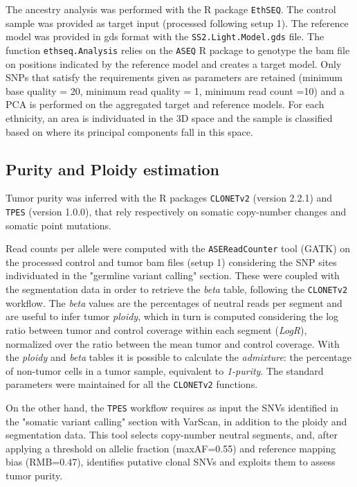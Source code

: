 \documentclass[11pt]{article}
\begin{document}
The ancestry analysis was performed with the R package \texttt{EthSEQ}\cite{ethseq}. The control sample was provided as target input (processed following setup 1). The reference model was provided in gds format with the \texttt{SS2.Light.Model.gds} file. The function \texttt{ethseq.Analysis} relies on the \texttt{ASEQ} R package to genotype the bam file on positions indicated by the reference model and creates a target model. Only SNPs that satisfy the requirements given as parameters are retained (minimum base quality = 20, minimum read quality = 1, minimum read count =10) and a PCA is performed on the aggregated target and reference models. For each ethnicity, an area is individuated in the 3D space and the sample is classified based on where its principal components fall in this space.


\subsection*{Purity and Ploidy estimation}

Tumor purity was inferred with the R packages \texttt{CLONETv2} (version 2.2.1)\cite{clonet} and \texttt{TPES} (version 1.0.0)\cite{tpes}, that rely respectively on somatic copy-number changes and somatic point mutations.

Read counts per allele were computed with the \texttt{ASEReadCounter} tool (GATK) on the processed control and tumor bam files (setup 1) considering the SNP sites individuated in the "germline variant calling" section. These were coupled with the segmentation data in order to retrieve the \textit{beta} table, following the \texttt{CLONETv2} workflow. The \textit{beta} values are the percentages of neutral reads per segment and are useful to infer tumor \textit{ploidy}, which in turn is computed considering the log ratio between tumor and control coverage within each segment (\textit{LogR}), normalized over the ratio between the mean tumor and control coverage. With the \textit{ploidy} and \textit{beta} tables it is possible to calculate the \textit{admixture}: the percentage of non-tumor cells in a tumor sample, equivalent to \textit{1-purity}. The standard parameters were maintained for all the \texttt{CLONETv2} functions.

On the other hand, the \texttt{TPES} workflow requires as input the SNVs identified in the "somatic variant calling" section with VarScan, in addition to the ploidy and segmentation data. This tool selects copy-number neutral segments, and, after applying a threshold on allelic fraction (maxAF=0.55) and reference mapping bias (RMB=0.47), identifies putative clonal SNVs and exploits them to assess tumor purity.
\end{document}
